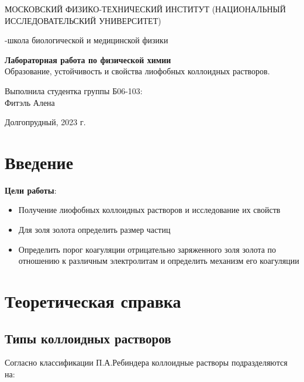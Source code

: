 \documentclass[a4paper,12pt]{article}
\begin{document}
\def\figurename{Рисунок}
\begin{titlepage}
\begin{center}
    {\large МОСКОВСКИЙ ФИЗИКО-ТЕХНИЧЕСКИЙ ИНСТИТУТ (НАЦИОНАЛЬНЫЙ ИССЛЕДОВАТЕЛЬСКИЙ УНИВЕРСИТЕТ)}
\end{center}
\begin{center}
    {-школа биологической и медицинской физики}
\end{center}

\vspace{1cm}
{\huge
\begin{center}
    {\bf Лабораторная работа по физической химии}\\
    \vspace{0.5cm}
   Образование, устойчивость и свойства лиофобных коллоидных растворов.
\end{center}
}

\vspace{4cm}
\begin{flushright}
{\LARGE Выполнила студентка группы Б06-103:\\ Фитэль Алена \\}

\end{flushright}
\vspace{9cm}
\begin{center}
    Долгопрудный, 2023 г.
\end{center}
\end{titlepage}
\newpage

\section{Введение}
\setcounter{page}{2}
\textbf{Цели работы}: 
\begin{itemize}
 \item Получение лиофобных коллоидных растворов и исследование их свойств
    \item Для золя золота определить размер частиц 
    \item Определить порог коагуляции отрицательно заряженного золя золота по отношению к различным электролитам и определить механизм его коагуляции
\end{itemize}
\section{Теоретическая справка \cite{1}}
\subsection{Типы коллоидных растворов}
Согласно классификации П.А.Ребиндера коллоидные растворы подразделяются на:
\end{document}
